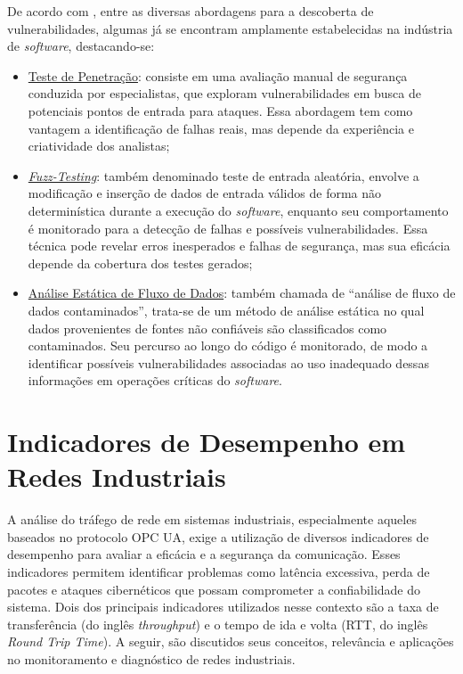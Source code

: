         De acordo com , entre as diversas abordagens para a descoberta de  vulnerabilidades, algumas já se encontram amplamente estabelecidas na indústria de \textit{software}, destacando-se:        
        
        \begin{itemize}
            \item \underline{Teste de Penetração}: consiste em uma avaliação manual de segurança conduzida por especialistas, que exploram vulnerabilidades em busca de potenciais pontos de entrada para ataques. Essa abordagem tem como vantagem a identificação de falhas reais, mas depende da experiência e criatividade dos analistas;
            \item \underline{\textit{Fuzz-Testing}}: também denominado teste de entrada aleatória, envolve a modificação e inserção de dados de entrada válidos de forma não determinística durante a execução do \textit{software}, enquanto seu comportamento é monitorado para a detecção de falhas e possíveis vulnerabilidades. Essa técnica pode revelar erros inesperados e falhas de segurança, mas sua eficácia depende da cobertura dos testes gerados;
            \item \underline{Análise Estática de Fluxo de Dados}: também chamada de ``análise de fluxo de dados contaminados'', trata-se de um método de  análise estática no qual dados provenientes de fontes não confiáveis são classificados como contaminados. Seu percurso ao longo do código é monitorado, de modo a identificar possíveis vulnerabilidades associadas ao uso inadequado dessas informações em operações críticas do \textit{software}.
        \end{itemize}

\section{Indicadores de Desempenho em Redes Industriais}

    A análise do tráfego de rede em sistemas industriais, especialmente aqueles baseados no protocolo OPC UA, exige a utilização de diversos  indicadores de desempenho para avaliar a eficácia e a segurança da comunicação. Esses indicadores permitem identificar problemas como latência excessiva, perda de pacotes e ataques cibernéticos que possam comprometer a confiabilidade do sistema. Dois dos principais indicadores utilizados nesse contexto são a taxa de transferência (do inglês \textit{throughput}) e o tempo de ida e volta (RTT, do inglês \textit{Round Trip Time}). A seguir, são discutidos seus conceitos, relevância e aplicações no monitoramento e diagnóstico de redes industriais.
    
